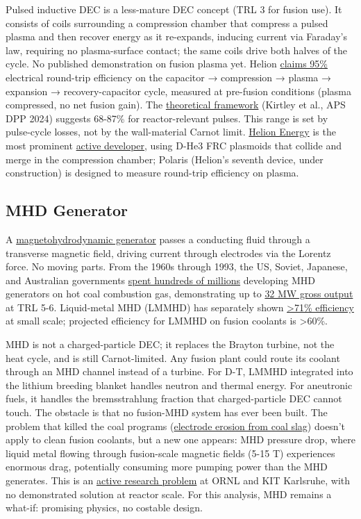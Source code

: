 \documentclass{article}
\begin{document}
Pulsed inductive DEC is a less-mature DEC concept (TRL 3 for fusion
use). It consists of coils surrounding a compression chamber that
compress a pulsed plasma and then recover energy as it re-expands,
inducing current via Faraday's law, requiring no plasma-surface contact;
the same coils drive both halves of the cycle. No published
demonstration on fusion plasma yet. Helion
\href{https://www.helionenergy.com/}{claims 95\%} electrical round-trip
efficiency on the capacitor → compression → plasma → expansion →
recovery-capacitor cycle, measured at pre-fusion conditions (plasma
compressed, no net fusion gain). The
\href{https://youtu.be/5nHmqk1cI2E?t=505}{theoretical framework}
(Kirtley et al., APS DPP 2024) suggests 68-87\% for reactor-relevant
pulses. This range is set by pulse-cycle losses, not by the
wall-material Carnot limit. \href{https://www.helionenergy.com/}{Helion
Energy} is the most prominent
\href{https://doi.org/10.1088/0029-5515/51/5/053008}{active developer},
using D-He3 FRC plasmoids that collide and merge in the compression
chamber; Polaris (Helion's seventh device, under construction) is
designed to measure round-trip efficiency on plasma.

\subsection{MHD Generator}\label{mhd-generator}

A \href{https://inis.iaea.org/records/4ss3z-rqd83}{magnetohydrodynamic
generator} passes a conducting fluid through a transverse magnetic
field, driving current through electrodes via the Lorentz force. No
moving parts. From the 1960s through 1993, the US, Soviet, Japanese, and
Australian governments
\href{https://www.gao.gov/products/emd-80-14}{spent hundreds of
millions} developing MHD generators on hot coal combustion gas,
demonstrating up to \href{https://www.osti.gov/biblio/6380343}{32 MW
gross output} at TRL 5-6. Liquid-metal MHD (LMMHD) has separately shown
\href{https://doi.org/10.1016/0196-8904(81)90006-6}{\textgreater71\%
efficiency} at small scale; projected efficiency for LMMHD on fusion
coolants is \textgreater60\%.

MHD is not a charged-particle DEC; it replaces the Brayton turbine, not
the heat cycle, and is still Carnot-limited. Any fusion plant could
route its coolant through an MHD channel instead of a turbine. For D-T,
LMMHD integrated into the lithium breeding blanket handles neutron and
thermal energy. For aneutronic fuels, it handles the bremsstrahlung
fraction that charged-particle DEC cannot touch. The obstacle is that no
fusion-MHD system has ever been built. The problem that killed the coal
programs (\href{https://www.gao.gov/products/emd-80-14}{electrode
erosion from coal slag}) doesn't apply to clean fusion coolants, but a
new one appears: MHD pressure drop, where liquid metal flowing through
fusion-scale magnetic fields (5-15 T) experiences enormous drag,
potentially consuming more pumping power than the MHD generates. This is
an \href{https://doi.org/10.3390/en14206640}{active research problem} at
ORNL and KIT Karlsruhe, with no demonstrated solution at reactor scale.
For this analysis, MHD remains a what-if: promising physics, no costable
design.
\end{document}
